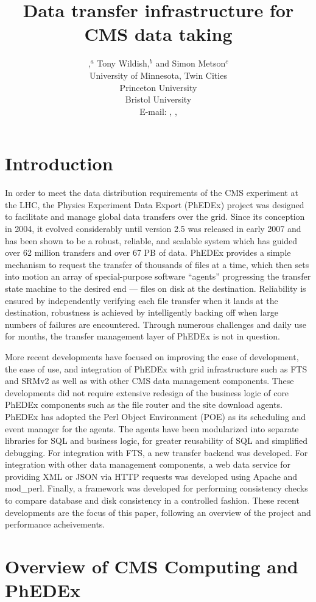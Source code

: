 \documentclass{PoS}
\title{Data transfer infrastructure for CMS data taking}
\author{
  \speaker{Ricky Egeland},$^a$ Tony Wildish,$^{b}$ and Simon Metson$^{c}$\\ 
  \llap{$^a$}University of Minnesota, Twin Cities\\ 
  \llap{$^b$}Princeton University\\ 
  \llap{$^c$}Bristol University\\ 
  E-mail: \email{Ricky.Egeland@cern.ch}, \email{Tony.Wildish@cern.ch}, \email{Simon.Metson@cern.ch}
}
\begin{document}
\section{Introduction}

In order to meet the data distribution requirements
\cite{cms-comp-proposal, cms-comp-tdr, cms-comp-model} of the CMS
\cite{cms-proposal} experiment at the LHC, the Physics Experiment Data
Export (PhEDEx) \cite{phedex-chep06, phedex-chep07} project was
designed to facilitate and manage global data transfers over the grid.
Since its conception in 2004, it evolved considerably until version
2.5 was released in early 2007 and has been shown to be a robust,
reliable, and scalable system which has guided over 62 million
transfers and over 67 PB of data.  PhEDEx provides a simple mechanism
to request the transfer of thousands of files at a time, which then
sets into motion an array of special-purpose software ``agents''
progressing the transfer state machine to the desired end --- files on
disk at the destination.  Reliability is ensured by independently
verifying each file transfer when it lands at the destination,
robustness is achieved by intelligently backing off when large numbers
of failures are encountered.  Through numerous challenges and daily
use for months, the transfer management layer of PhEDEx is not in
question.

More recent developments have focused on improving the ease of
development, the ease of use, and integration of PhEDEx with grid
infrastructure such as FTS and SRMv2 as well as with other CMS data
management components.  These developments did not require extensive
redesign of the business logic of core PhEDEx components such as the
file router and the site download agents.  PhEDEx has adopted the Perl
Object Environment (POE) as its scheduling and event manager for the
agents.  The agents have been modularized into separate libraries for
SQL and business logic, for greater reusability of SQL and simplified
debugging.  For integration with FTS, a new transfer backend was
developed.  For integration with other data management components, a
web data service for providing XML or JSON via HTTP requests was
developed using Apache and mod\_perl.  Finally, a framework was
developed for performing consistency checks to compare database and
disk consistency in a controlled fashion.  These recent developments
are the focus of this paper, following an overview of the
project and performance acheivements.

\section{Overview of CMS Computing and PhEDEx}
\end{document}
